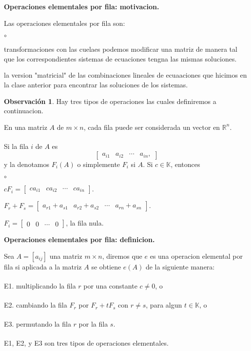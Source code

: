 \documentclass{article}
\theoremstyle{definition}
\theoremstyle{definition}
\newtheorem*{obs}{Observación}
\theoremstyle{remark}
\begin{document}
\begin{center}
\textbf{Operaciones elementales por fila: motivacion.}
\end{center}
Las operaciones elementales por fila son:
\begin{list}{$\circ$}{}  
\item transformaciones con las cuelaes podemos modificar una matriz de manera tal que los correspondientes sistemas de ecuaciones tengna las mismas soluciones. 
\item la version "matricial" de las combinaciones lineales de ecuaaciones que hicimos en la clase anterior para encontrar las soluciones de los sistemas.
\end{list}\pagebreak

\begin{obs}
  Hay tres tipos de operaciones las cuales definiremos a continuacion.
\end{obs}
En una matriz $A$ de $m \times n$, cada fila puede ser considerada un vector en $\mathbb{R}^n$. \\\\
Si la fila $i$ de $A$ es \[
  \begin{bmatrix}
    a_{i1} & a_{i2} & \cdots & a_{in},
  \end{bmatrix}
\]
y la denotamos $F_i (A)$ o simplemente $F_i$ si $A$. Si $c \in \mathbb{K}$, entonces 
\begin{list}{$\circ$}{}  
\item $cF_{i} = \begin{bmatrix} 
    ca_{i1} & ca_{i2} & \cdots & ca_{in}
  \end{bmatrix}.$
\item $F_r + F_s = \begin{bmatrix}
    a_{r1}+a_{s1} & a_{r2} + a_{s2} & \cdots & a_{rn}+a_{sn}
  \end{bmatrix}$.
\item $F_i=\begin{bmatrix} 
    0 & 0 & \cdots & 0
  \end{bmatrix}$, la fila nula.
\end{list}
\begin{center}
\textbf{Operaciones elementales por fila: definicion.}
\end{center}
\begin{defi}
  Sea $A= [a_{ij}]$ una matriz $ m \times n$, diremos que $e$ es una operacion elemental por fila si aplicada a la matriz $A$ se obtiene $e(A)$ de la siguiente manera:\\\\
  \textcolor{azulp2}{E1.} multiplicando la fila $r$ por una constante $c \neq 0$, o \\\\
  \textcolor{azulp2}{E2.} cambiando la fila $F_r$ por $F_r+tF_s$ con $r \neq s$, para algun $t \in \mathbb{K}$, o\\\\
  \textcolor{azulp2}{E3.} permutando la fila $r$ por la fila $s$.\\\\
  E1, E2, y E3 son tres tipos de operaciones elementales.
\end{defi}
\end{document}
